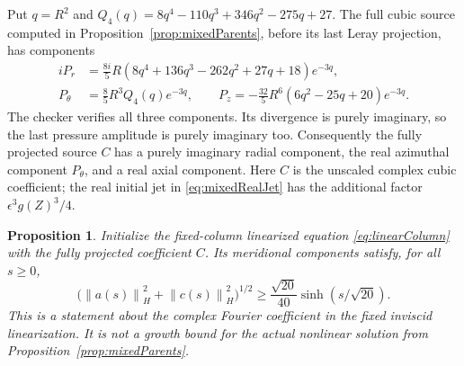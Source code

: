 \documentclass[11pt]{article}
\newtheorem{proposition}[theorem]{Proposition}
\theoremstyle{remark}
\newcommand{\norm}[1]{\left\lVert#1\right\rVert}
\begin{document}
Put $q=R^2$ and $Q_4(q)=8q^4-110q^3+346q^2-275q+27$.
The full cubic source computed in Proposition~\ref{prop:mixedParents},
before its last Leray projection, has components
\begin{align*}
 iP_r&=\frac{8i}{5}R(8q^4+136q^3-262q^2+27q+18)e^{-3q},\\
 P_\theta&=\frac85 R^3Q_4(q)e^{-3q},\qquad
 P_z=-\frac{32}{5}R^6(6q^2-25q+20)e^{-3q}.
\end{align*}
The checker verifies all three components. Its divergence is purely
imaginary, so the last pressure amplitude is purely imaginary too.
Consequently the fully projected source $C$ has a purely imaginary
radial component, the real azimuthal component $P_\theta$, and a real
axial component. Here $C$ is the unscaled complex cubic coefficient;
the real initial jet in \eqref{eq:mixedRealJet} has the additional
factor $\epsilon^3g(Z)^3/4$.

\begin{proposition}\label{prop:linearSeedCoupling}
Initialize the fixed-column linearized equation \eqref{eq:linearColumn}
with the fully projected coefficient $C$. Its meridional components
satisfy, for all $s\geq0$,
\[
 \big(\norm{a(s)}_H^2+\norm{c(s)}_H^2\big)^{1/2}
       \geq\frac{\sqrt{20}}{40}\sinh(s/\sqrt{20}).
\]
This is a statement about the complex Fourier coefficient in the fixed
inviscid linearization. It is not a growth bound for the actual nonlinear
solution from Proposition~\ref{prop:mixedParents}.
\end{proposition}
\end{document}
